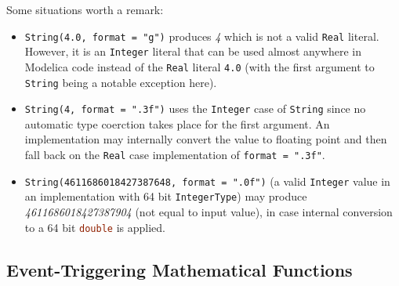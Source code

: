 \begin{operatordefinition*}[String]
\begin{semantics}
\begin{example}
Some situations worth a remark:
\begin{itemize}
\item
  \lstinline!String(4.0, format = "g")! produces \emph{4} which is not a valid \lstinline!Real! literal.
  However, it is an \lstinline!Integer! literal that can be used almost anywhere in Modelica code instead of the \lstinline!Real! literal \lstinline{4.0} (with the first argument to \lstinline!String! being a notable exception here).
\item
  \lstinline!String(4, format = ".3f")! uses the \lstinline!Integer! case of \lstinline!String! since no automatic type coerction takes place for the first argument.
  An implementation may internally convert the value to floating point and then fall back on the \lstinline!Real! case implementation of \lstinline!format = ".3f"!.
\item
  \lstinline!String(4611686018427387648, format = ".0f")! (a valid \lstinline!Integer! value in an implementation with 64 bit \lstinline!IntegerType!) may produce \emph{4611686018427387904} (not equal to input value), in case internal conversion to a 64 bit \lstinline[language=C]!double! is applied.
\end{itemize}
\end{example}
\end{semantics}
\end{operatordefinition*}


\subsection{Event-Triggering Mathematical Functions}\label{event-triggering-mathematical-functions}

